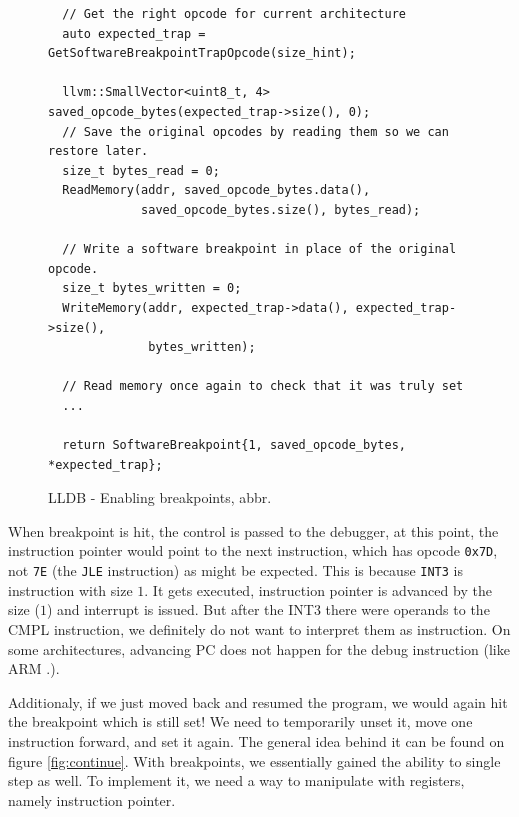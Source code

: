 \begin{figure}\label{fig:lldb-breakpoints-enable}
    \begin{verbatim}
  // Get the right opcode for current architecture
  auto expected_trap = GetSoftwareBreakpointTrapOpcode(size_hint);

  llvm::SmallVector<uint8_t, 4> saved_opcode_bytes(expected_trap->size(), 0);
  // Save the original opcodes by reading them so we can restore later.
  size_t bytes_read = 0;
  ReadMemory(addr, saved_opcode_bytes.data(),
             saved_opcode_bytes.size(), bytes_read);

  // Write a software breakpoint in place of the original opcode.
  size_t bytes_written = 0;
  WriteMemory(addr, expected_trap->data(), expected_trap->size(),
              bytes_written);

  // Read memory once again to check that it was truly set
  ...

  return SoftwareBreakpoint{1, saved_opcode_bytes, *expected_trap};
    \end{verbatim}
    \caption{LLDB - Enabling breakpoints, abbr.}
\end{figure}

When breakpoint is hit, the control is passed to the debugger, at this point,
the instruction pointer would point to the next instruction, which has opcode
\texttt{0x7D}, not \texttt{7E} (the \texttt{JLE} instruction) as might be
expected. This is because \texttt{INT3} is instruction with size $1$. It gets
executed, instruction pointer is advanced by the size ($1$) and interrupt is
issued. But after the INT3 there were operands to the CMPL instruction, we
definitely do not want to interpret them as instruction. On some architectures,
advancing PC does not happen for the debug instruction (like ARM .).

Additionaly, if we just moved back and resumed the program, we would again hit
the breakpoint which is still set! We need to temporarily unset it, move one
instruction forward, and set it again. The general idea behind it can be found
on figure \ref{fig:continue}. With breakpoints, we essentially gained the
ability to single step as well. To implement it, we need a way to manipulate
with registers, namely instruction pointer. 

